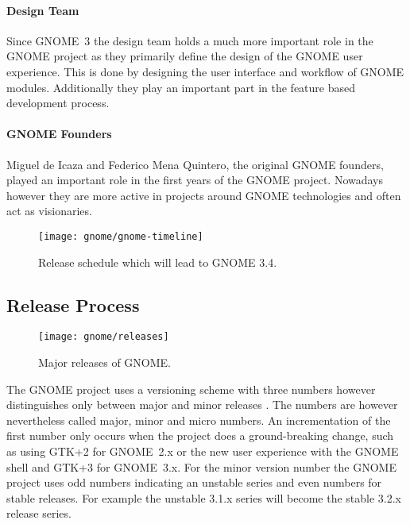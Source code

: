 \paragraph{Design Team}

Since GNOME~3 the design team holds a much more important role in the GNOME
project as they primarily define the design of the GNOME user experience. This
is done by designing the user interface and workflow of GNOME modules.
Additionally they play an important part in the feature based development
process.

\paragraph{GNOME Founders}

Miguel de Icaza and Federico Mena Quintero, the original GNOME founders, played
an important role in the first years of the GNOME project. Nowadays however
they are more active in projects around GNOME technologies and often act as
visionaries.

\begin{figure}[h!tbp]
  \centering
  \texttt{[image: gnome/gnome-timeline]}
  \caption[GNOME 3.4 Release Schedule]{Release schedule which will lead to GNOME 3.4.}
\end{figure}


\subsection{Release Process} %

\begin{figure}[htbp]
  \centering
  \texttt{[image: gnome/releases]}
  \caption[Major Releases of GNOME]{Major releases of GNOME.}
\end{figure}

The GNOME project uses a versioning scheme with three numbers however
distinguishes only between major and minor releases
\cite{GNOMEDevelopmentSchedule,GNOMESchedule}. The numbers are however
nevertheless called major, minor and micro numbers. An incrementation of the
first number only occurs when the project does a ground-breaking change, such
as using \ac{GTK}+2 for GNOME~2.x or the new user experience with the GNOME shell
and \ac{GTK}+3 for GNOME~3.x. For the minor version number the GNOME project uses
odd numbers indicating an unstable series and even numbers for stable releases.
For example the unstable 3.1.x series will become the stable 3.2.x release
series.

